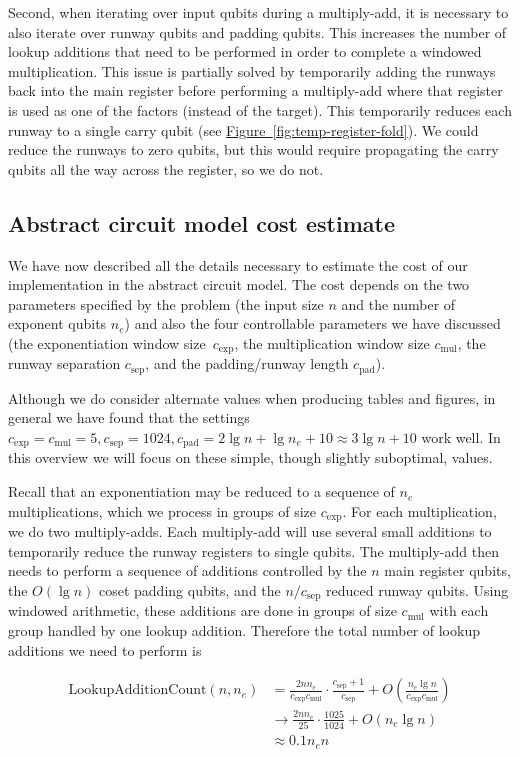\documentclass[a4paper, onecolumn, accepted=2021-03-29]{quantumarticle}
\newcommand{\fig}[1]{\hyperref[fig:#1]{Figure~\ref*{fig:#1}}}
\newcommand{\lenexp}{{n_e}}
\newcommand{\gexp}{{c_{\text{exp}}}}
\newcommand{\gmul}{{c_{\text{mul}}}}
\newcommand{\gsep}{{c_{\text{sep}}}}
\newcommand{\gpad}{{c_{\text{pad}}}}
\begin{document}
Second, when iterating over input qubits during a multiply-add, it is necessary to also iterate over runway qubits and padding qubits.
This increases the number of lookup additions that need to be performed in order to complete a windowed multiplication.
This issue is partially solved by temporarily adding the runways back into the main register before performing a multiply-add where that register is used as one of the factors (instead of the target).
This temporarily reduces each runway to a single carry qubit (see \fig{temp-register-fold}).
We could reduce the runways to zero qubits, but this would require propagating the carry qubits all the way across the register, so we do not.


\subsection{Abstract circuit model cost estimate}

We have now described all the details necessary to estimate the cost of our implementation in the abstract circuit model.
The cost depends on the two parameters specified by the problem (the input size $n$ and the number of exponent qubits $\lenexp$) and also the four controllable parameters we have discussed (the exponentiation window size~$\gexp$, the multiplication window size $\gmul$, the runway separation $\gsep$, and the padding/runway length $\gpad$).

Although we do consider alternate values when producing tables and figures, in general we have found that the settings $\gexp=\gmul=5, \gsep=1024, \gpad=2 \lg n + \lg \lenexp + 10 \approx 3 \lg n + 10$ work well.
In this overview we will focus on these simple, though slightly suboptimal, values.

Recall that an exponentiation may be reduced to a sequence of $\lenexp$ multiplications, which we process in groups of size $\gexp$.
For each multiplication, we do two multiply-adds.
Each multiply-add will use several small additions to temporarily reduce the runway registers to single qubits.
The multiply-add then needs to perform a sequence of additions controlled by the $n$ main register qubits, the $O(\lg n)$ coset padding qubits, and the $n/\gsep$ reduced runway qubits.
Using windowed arithmetic, these additions are done in groups of size $\gmul$ with each group handled by one lookup addition.
Therefore the total number of lookup additions we need to perform is

\begin{equation}
\begin{aligned}
    \text{LookupAdditionCount}(n, \lenexp)
    &= \frac{2 n \lenexp}{\gexp \gmul} \cdot \frac{\gsep + 1}{\gsep} + O\left( \frac{\lenexp \lg n}{\gexp \gmul} \right)
    \\&\rightarrow \frac{2 n \lenexp}{25} \cdot \frac{1025}{1024} + O\left(\lenexp \lg n\right)
    \\&\approx 0.1 \lenexp n
\end{aligned}
\end{equation}
\end{document}
